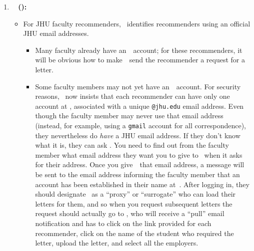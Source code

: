 \documentclass{\econtex}
\begin{document}

\begin{enumerate}

\item \textbf{\EJM ~ (\EJMLink):}
  \begin{itemize}
  \item For JHU faculty recommenders, {\EJM}~identifies recommenders using
    an official JHU email addresses.  

    \begin{itemize}
    \item Many faculty already have an~\EJM~account; for these
      recommenders, it will be obvious how to make~\EJM~send the
      recommender a request for a letter.

    \item Some faculty members may not yet have an~\EJM~account.  For security reasons, \EJM~now insists that each recommender can have only one account at \EJM, associated with a unique \texttt{@jhu.edu} email address.  Even though the faculty member may never use that email address (instead, for example, using a \texttt{gmail} account for all correspondence), they nevertheless do \textit{ have} a JHU email address.  If they don't know what it is, they can ask \jmstaffemail.  You need to find out from the faculty member what email address they want you to give to \EJM~when it asks for their address.  Once you give~\EJM~that email address, a message will be sent to the email address informing the faculty member that an account has been established in their name at~\EJM.  After logging in, they should designate \jmstaffemail~as a ``proxy'' or ``surrogate'' who can load their letters for them, and so when you request subsequent letters the request should actually go to \jmstaffemail, who will receive a ``pull'' email notification and has to click on the link provided for each recommender, click on the name of the student who required the letter, upload the letter, and select all the employers.

    \end{itemize}


\end{itemize}
\end{enumerate}
\end{document}

